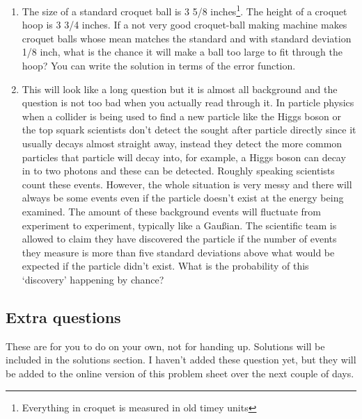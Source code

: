 \documentclass[11pt,a4paper]{scrartcl}
\begin{document}
\begin{enumerate}

\item The size of a standard croquet ball is 3 5/8
  inches\footnote{Everything in croquet is measured in old timey
    units}. The height of a croquet hoop is 3 3/4 inches. If a not
  very good croquet-ball making machine makes croquet balls whose mean
  matches the standard and with standard deviation 1/8 inch, what is
  the chance it will make a ball too large to fit through the hoop?
  You can write the solution in terms of the error function.



\item This will look like a long question but it is almost all
  background and the question is not too bad when you actually read
  through it. In particle physics when a collider is being used to
  find a new particle like the Higgs boson or the top squark
  scientists don't detect the sought after particle directly since it
  usually decays almost straight away, instead they detect the more
  common particles that particle will decay into, for example, a Higgs
  boson can decay in to two photons and these can be detected. Roughly
  speaking scientists count these events. However, the whole situation
  is very messy and there will always be some events even if the
  particle doesn't exist at the energy being examined. The amount of
  these background events will fluctuate from experiment to
  experiment, typically like a Gau\ss{}ian. The scientific team is
  allowed to claim they have discovered the particle if the number of
  events they measure is more than five standard deviations above
  what would be expected if the particle didn't exist. What is the
  probability of this \lq{}discovery\rq{} happening by chance?



\end{enumerate}

\subsection*{Extra questions}

These are for you to do on your own, not for handing up. Solutions will be included in the solutions section. I haven't added these question yet, but they will be added to the online version of this problem sheet over the next couple of days.
\end{document}
